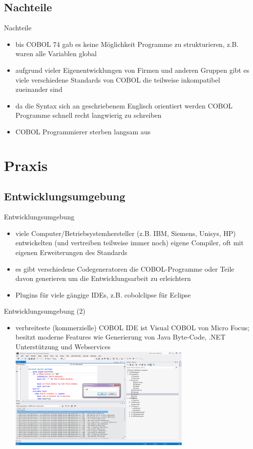 \documentclass[handout]{beamer}
\begin{document}
\subsection{Nachteile}
\begin{frame}{Nachteile}
	\begin{itemize}[<+->]
		\item
		    bis COBOL 74 gab es keine M\"oglichkeit Programme zu strukturieren, z.B. waren alle Variablen global
		\item
			aufgrund vieler Eigenentwicklungen von Firmen und anderen Gruppen gibt es viele verschiedene Standards von COBOL die teilweise inkompatibel zueinander sind
		\item
			da die Syntax sich an geschriebenem Englisch orientiert werden COBOL Programme schnell recht langwierig zu schreiben
		\item
			COBOL Programmierer sterben langsam aus
	\end{itemize}
\end{frame}


\section{Praxis}
\subsection{Entwicklungsumgebung}
\begin{frame}{Entwicklungsumgebung}
	\begin{itemize}[<+->]
		\item
			viele Computer/Betriebsystemhersteller (z.B. IBM, Siemens, Unisys, HP) entwickelten (und vertreiben teilweise immer noch) eigene Compiler, oft mit eigenen Erweiterungen des Standards
		\item
			es gibt verschiedene Codegeneratoren die COBOL-Programme oder Teile davon generieren um die Entwicklungsarbeit zu erleichtern
		\item
			Plugins für viele gängige IDEs, z.B. cobolclipse für Eclipse
	\end{itemize}
\end{frame}

\begin{frame}{Entwicklungsumgebung (2)}
	\begin{itemize}
		\item
			verbreiteste (kommerzielle) COBOL IDE ist Visual COBOL von Micro Focus; besitzt moderne Features wie Generierung von Java Byte-Code, .NET Unterstützung und Webservices
		\includegraphics[width=9cm]{VisualCOBOL2}
	\end{itemize}
\end{frame}
\end{document}
